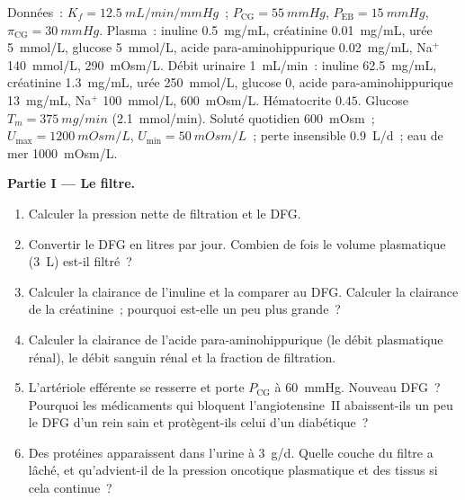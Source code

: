 \begin{problem}
\label{pb:b3:renal-osmoregulation:1}
Données~: $K_{f} = \qty{12.5}{mL/min/mmHg}$~; $P_{\text{CG}} = \qty{55}{mmHg}$,
$P_{\text{EB}} = \qty{15}{mmHg}$, $\pi_{\text{CG}} = \qty{30}{mmHg}$.
Plasma~: inuline \qty{0.5}{mg/mL}, créatinine \qty{0.01}{mg/mL}, urée
\qty{5}{mmol/L}, glucose \qty{5}{mmol/L}, acide para-aminohippurique
\qty{0.02}{mg/mL}, Na$^{+}$ \qty{140}{mmol/L}, 
\qty{290}{mOsm/L}. Débit urinaire \qty{1}{mL/min}~: inuline \qty{62.5}{mg/mL},
créatinine \qty{1.3}{mg/mL}, urée \qty{250}{mmol/L}, glucose $0$,
acide para-aminohippurique \qty{13}{mg/mL}, Na$^{+}$ \qty{100}{mmol/L},
 \qty{600}{mOsm/L}. Hématocrite $0.45$. Glucose $T_{m} =
\qty{375}{mg/min}$ (\qty{2.1}{mmol/min}). Soluté quotidien \qty{600}{mOsm}~;
$U_{\max} = \qty{1200}{mOsm/L}$, $U_{\min} = \qty{50}{mOsm/L}$~;
perte insensible \qty{0.9}{L/d}~; eau de mer \qty{1000}{mOsm/L}.

\medskip
\noindent\textbf{Partie I --- Le filtre.}
\begin{enumerate}
  \item Calculer la pression nette de filtration et le DFG.
  \item Convertir le DFG en litres par jour. Combien de fois le volume
        plasmatique (\qty{3}{L}) est-il filtré~?
  \item Calculer la clairance de l'inuline et la comparer au DFG.
        Calculer la clairance de la créatinine~; pourquoi est-elle un
        peu plus grande~?
  \item Calculer la clairance de l'acide para-aminohippurique (le débit
        plasmatique rénal), le débit sanguin rénal et la fraction de
        filtration.
  \item L'artériole efférente se resserre et porte $P_{\text{CG}}$ à
        \qty{60}{mmHg}. Nouveau DFG~? Pourquoi les médicaments qui
        bloquent l'angiotensine~II abaissent-ils un peu le DFG d'un rein
        sain et protègent-ils celui d'un diabétique~?
  \item Des protéines apparaissent dans l'urine à \qty{3}{g/d}. Quelle
        couche du filtre a lâché, et qu'advient-il de la pression
        oncotique plasmatique et des tissus si cela continue~?
\end{enumerate}


\end{problem}
